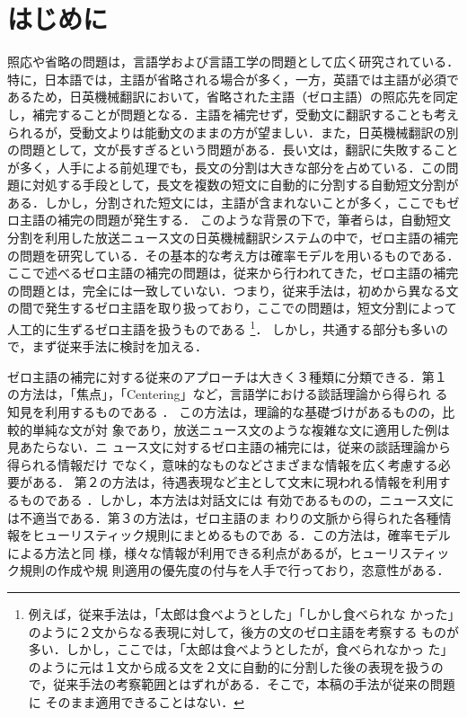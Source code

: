 

\maketitle



\section{はじめに} \label{sec:はじめに}

照応や省略の問題は，言語学および言語工学の問題として広く研究されている．特に，日本語では，主語が省略される場合が多く，一方，英語では主語が必須であるため，日英機械翻訳において，省略された主語（ゼロ主語）の照応先を同定し，補完することが問題となる．主語を補完せず，受動文に翻訳することも考えられるが，受動文よりは能動文のままの方が望ましい．また，日英機械翻訳の別の問題として，文が長すぎるという問題がある．長い文は，翻訳に失敗することが多く，人手による前処理でも，長文の分割は大きな部分を占めている．この問題に対処する手段として，長文を複数の短文に自動的に分割する自動短文分割がある．しかし，分割された短文には，主語が含まれないことが多く，ここでもゼロ主語の補完の問題が発生する．
このような背景の下で，筆者らは，自動短文分割を利用した放送ニュース文の日英機械翻訳システムの中で，ゼロ主語の補完の問題を研究している．その基本的な考え方は確率モデルを用いるものである．ここで述べるゼロ主語の補完の問題は，従来から行われてきた，ゼロ主語の補完の問題とは，完全には一致していない．つまり，従来手法は，初めから異なる文の間で発生するゼロ主語を取り扱っており，ここでの問題は，短文分割によって人工的に生ずるゼロ主語を扱うものである
\footnote{例えば，従来手法は，「太郎は食べようとした」「しかし食べられな
  かった」のように２文からなる表現に対して，後方の文のゼロ主語を考察する
  ものが多い．しかし，ここでは，「太郎は食べようとしたが，食べられなかっ
  た」のように元は１文から成る文を２文に自動的に分割した後の表現を扱うの
  で，従来手法の考察範囲とはずれがある．そこで，本稿の手法が従来の問題に
  そのまま適用できることはない．}．
しかし，共通する部分も多いので，まず従来手法に検討を加える．

ゼロ主語の補完に対する従来のアプローチは大きく３種類に分類できる．第１
の方法は，「焦点」，「Centering」など，言語学における談話理論から得られ
る知見を利用するものである
\cite{Yoshimoto88,Nakagawa92,Nomoto93,Walker94,Takada95,清水95}．
この方法は，理論的な基礎づけがあるものの，比較的単純な文が対
象であり，放送ニュース文のような複雑な文に適用した例は見あたらない．ニ
ュース文に対するゼロ主語の補完には，従来の談話理論から得られる情報だけ
でなく，意味的なものなどさまざまな情報を広く考慮する必要がある．
第２の方法は，待遇表現など主として文末に現われる情報を利用するものである
\cite{Yoshimoto88,堂坂89,鈴木92}．しかし，本方法は対話文には
有効であるものの，ニュース文には不適当である．第３の方法は，ゼロ主語のま
わりの文脈から得られた各種情報をヒューリスティック規則にまとめるものであ
る\cite{Carbonell88,村田95}．この方法は，確率モデルによる方法と同
様，様々な情報が利用できる利点があるが，ヒューリスティック規則の作成や規
則適用の優先度の付与を人手で行っており，恣意性がある．

